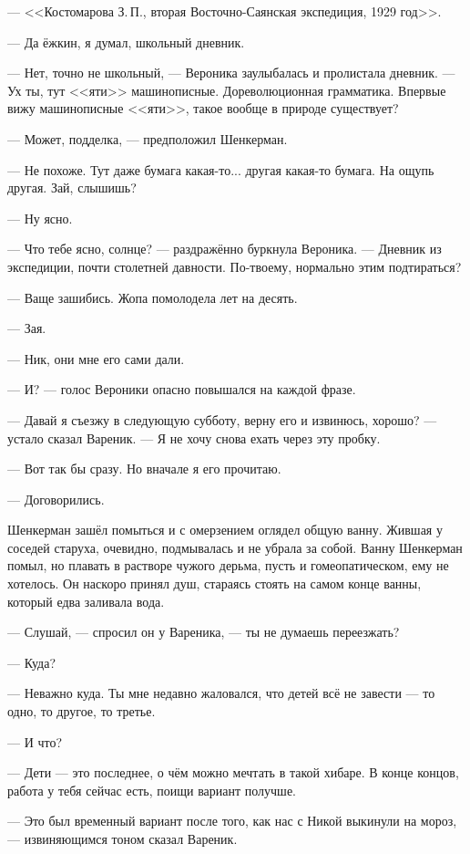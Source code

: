 --- <<Костомарова З.\,П., вторая Восточно-Саянская экспедиция, 1929 год>>.

--- Да ёжкин, я думал, школьный дневник.

--- Нет, точно не школьный, --- Вероника заулыбалась и пролистала дневник.
--- Ух ты, тут <<яти>> машинописные.
Дореволюционная грамматика.
Впервые вижу машинописные <<яти>>, такое вообще в природе существует?

--- Может, подделка, --- предположил Шенкерман.

--- Не похоже.
Тут даже бумага какая-то... другая какая-то бумага.
На ощупь другая.
Зай, слышишь?

--- Ну ясно.

--- Что тебе ясно, солнце? --- раздражённо буркнула Вероника.
--- Дневник из экспедиции, почти столетней давности.
По-твоему, нормально этим подтираться?

--- Ваще зашибись.
Жопа помолодела лет на десять.

--- Зая.

--- Ник, они мне его сами дали.

--- И? --- голос Вероники опасно повышался на каждой фразе.

--- Давай я съезжу в следующую субботу, верну его и извинюсь, хорошо? --- устало сказал Вареник.
--- Я не хочу снова ехать через эту пробку.

--- Вот так бы сразу.
Но вначале я его прочитаю.

--- Договорились.

\asterism

\textspace

Шенкерман зашёл помыться и с омерзением оглядел общую ванну.
Жившая у соседей старуха, очевидно, подмывалась и не убрала за собой.
Ванну Шенкерман помыл, но плавать в растворе чужого дерьма, пусть и гомеопатическом, ему не хотелось.
Он наскоро принял душ, стараясь стоять на самом конце ванны, который едва заливала вода.

--- Слушай, --- спросил он у Вареника, --- ты не думаешь переезжать?

--- Куда?

--- Неважно куда.
Ты мне недавно жаловался, что детей всё не завести --- то одно, то другое, то третье.

--- И что?

--- Дети --- это последнее, о чём можно мечтать в такой хибаре.
В конце концов, работа у тебя сейчас есть, поищи вариант получше.

--- Это был временный вариант после того, как нас с Никой выкинули на мороз, --- извиняющимся тоном сказал Вареник.

